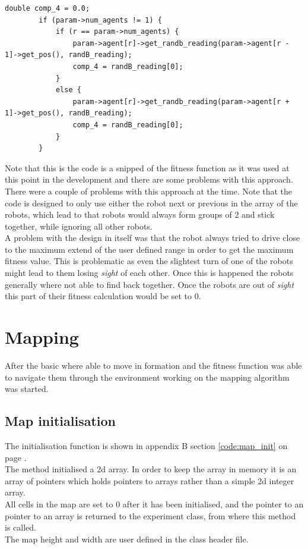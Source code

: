 \begin{lstlisting}[caption = {Fitness function calculation to consider the distance between 2 robots}]
  double comp_4 = 0.0;
        if (param->num_agents != 1) {
            if (r == param->num_agents) {
                param->agent[r]->get_randb_reading(param->agent[r - 1]->get_pos(), randB_reading);
                comp_4 = randB_reading[0];
            }
            else {
                param->agent[r]->get_randb_reading(param->agent[r + 1]->get_pos(), randB_reading);
                comp_4 = randB_reading[0];
            }
        }
\end{lstlisting}\label{chap3:comp4_code}

Note that this is the code is a snipped of the fitness function as it was used at this point in the development and there are some problems with this approach. \\
There were a couple of problems with this approach at the time. Note that the code is designed to only use either the robot next or previous in the array of the robots, which lead to that robots would always form groups of 2 and stick together, while ignoring all other robots.\\
A problem with the design in itself was that the robot always tried to drive close to the maximum extend of the user defined range in order to get the maximum fitness value. This is problematic as even the slightest turn of one of the robots might lead to them losing \textit{sight} of each other. Once this is happened the robots generally where not able to find back together. Once the robots are out of \textit{sight} this part of their fitness calculation would be set to 0. \\

\section{Mapping}
After the basic where able to move in formation and the fitness function was able to navigate them through the environment working on the mapping algorithm was started. \\
\subsection{Map initialisation}
\label{chap3:map_init}
The initialisation function is shown in appendix B section \ref{code:map_init} on page \pageref{code:map_init}. \\
The method initialised a 2d array. In order to keep the array in memory it is an array of pointers which holds pointers to arrays rather than a simple 2d integer array.\\
All cells in the map are set to 0 after it has been initialised, and the pointer to an pointer to an array is returned to the experiment class, from where this method is called.\\
The map height and width are user defined in the class header file.

